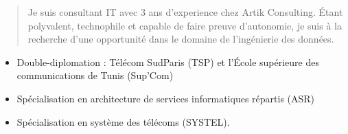 \documentclass[9pt,a4paper,ragged2e,normalphoto]{altacv}
\begin{document}

\begin{fullwidth}
\makecvheader
\end{fullwidth}


\begin{quote}
Je suis consultant IT avec 3 ans d'experience chez Artik Consulting.
Étant polyvalent, technophile et capable de faire preuve d'autonomie, je suis à la recherche d'une opportunité  dans le domaine de l'ingénierie des données.
\end{quote}



\begin{itemize}
\item Double-diplomation : Télécom SudParis (TSP) et l'École supérieure des communications de Tunis (Sup'Com)
\item Spécialisation en architecture de services informatiques répartis (ASR)
\item Spécialisation en système des télécoms (SYSTEL).
\end{itemize}

\begin{comment}

\cvevent{e}{Institut Préparatoire aux Études d'Ingénieurs El Manar (IPEIEM), Tunisie}{Septembre 2014 -- Juin 2016}{}
\begin{itemize}
\item Diplôme d'études universitaires de premier cycle en MP.
\end{itemize}
\divider

\cvevent{Baccalauréat}{Lycée les pères blancs, Tunisie}{juin 2014}{}
\begin{itemize}
\item Section: Mathématique - Moyenne: 15.96/20
\end{itemize}

\end{comment}
\end{document}
